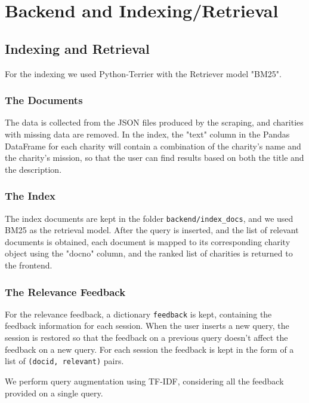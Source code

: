 \documentclass[unicode,9pt,a4paper,oneside,numbers=endperiod,openany]{scrartcl}
\begin{document}
\section{Backend and Indexing/Retrieval}

\subsection{Indexing and Retrieval}

For the indexing we used Python-Terrier with the Retriever model "BM25".

\subsubsection{The Documents}

The data is collected from the JSON files produced by the scraping, and charities with missing data are removed.
In the index, the "text" column in the Pandas DataFrame for each charity will contain a combination of the charity's name and the charity's mission, so that the user can find results based on both the title and the description.

\subsubsection{The Index}

The index documents are kept in the folder \texttt{backend/index\_docs}, and we used BM25 as the retrieval model. After the query is inserted, and the list of relevant documents is obtained, each document is mapped to its corresponding charity object using the "docno" column, and the ranked list of charities is returned to the frontend.

\subsubsection{The Relevance Feedback}

For the relevance feedback, a dictionary \texttt{feedback} is kept, containing the feedback information for each session. When the user inserts a new query, the session is restored so that the feedback on a previous query doesn't affect the feedback on a new query.
For each session the feedback is kept in the form of a list of  \texttt{(docid, relevant)} pairs.

We perform query augmentation using TF-IDF, considering all the feedback provided on a single query.
\end{document}
